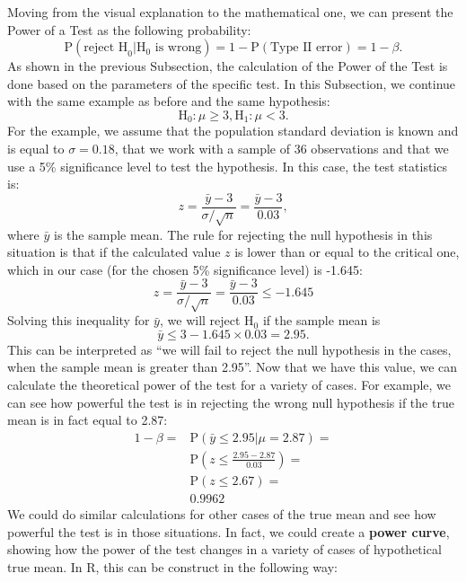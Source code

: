 \documentclass[
]{book}
\theoremstyle{definition}
\theoremstyle{definition}
\theoremstyle{definition}
\theoremstyle{definition}
\theoremstyle{remark}
\begin{document}
Moving from the visual explanation to the mathematical one, we can present the Power of a Test as the following probability:
\begin{equation}
    \mathrm{P}(\text{reject H}_0 | \mathrm{H}_0 \text{ is wrong}) = 1 - \mathrm{P}(\text{Type II error}) = 1-\beta.
    \label{eq:powerOfATestConcept}
\end{equation}
As shown in the previous Subsection, the calculation of the Power of the Test is done based on the parameters of the specific test. In this Subsection, we continue with the same example as before and the same hypothesis:
\begin{equation*}
    \mathrm{H}_0: \mu \geq 3, \mathrm{H}_1: \mu < 3.
\end{equation*}
For the example, we assume that the population standard deviation is known and is equal to \(\sigma=0.18\), that we work with a sample of 36 observations and that we use a 5\% significance level to test the hypothesis. In this case, the test statistics is:
\begin{equation}
    z = \frac{\bar{y}-3}{\sigma/\sqrt{n}} = \frac{\bar{y}-3}{0.03} ,
    \label{eq:powerOfATest01}
\end{equation}
where \(\bar{y}\) is the sample mean. The rule for rejecting the null hypothesis in this situation is that if the calculated value \(z\) is lower than or equal to the critical one, which in our case (for the chosen 5\% significance level) is -1.645:
\begin{equation*}
    z = \frac{\bar{y}-3}{\sigma/\sqrt{n}} = \frac{\bar{y}-3}{0.03} \leq -1.645
\end{equation*}
Solving this inequality for \(\bar{y}\), we will reject H\(_0\) if the sample mean is
\begin{equation}
    \bar{y} \leq 3 -1.645 \times 0.03 = 2.95 .
    \label{eq:powerOfATest02}
\end{equation}
This can be interpreted as ``we will fail to reject the null hypothesis in the cases, when the sample mean is greater than 2.95''. Now that we have this value, we can calculate the theoretical power of the test for a variety of cases. For example, we can see how powerful the test is in rejecting the wrong null hypothesis if the true mean is in fact equal to 2.87:
\begin{equation}
    \begin{aligned}
        1-\beta = & \mathrm{P}(\bar{y}\leq 2.95 | \mu=2.87) = \\
                  & \mathrm{P}\left(z \leq \frac{2.95 - 2.87}{0.03} \right) = \\
                  & \mathrm{P}\left(z \leq 2.67 \right) = \\
                  & 0.9962
    \end{aligned}
    \label{eq:powerOfATest03}
\end{equation}
We could do similar calculations for other cases of the true mean and see how powerful the test is in those situations. In fact, we could create a \textbf{power curve}, showing how the power of the test changes in a variety of cases of hypothetical true mean. In R, this can be construct in the following way:
\end{document}
